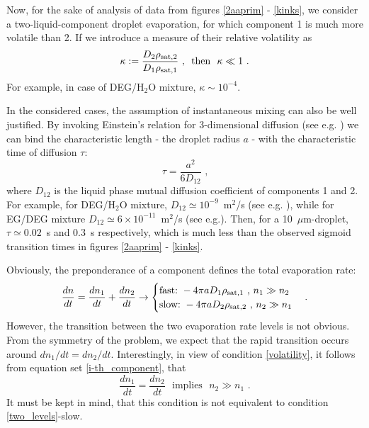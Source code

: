 \documentclass[twoside,twocolumn,9pt]{article}
\begin{document}
Now, for the sake of analysis of data from figures \ref{2aaprim} - \ref{kinks}, we consider a two-liquid-component droplet evaporation, for which component 1 is much more volatile than 2. If we introduce a measure of their relative volatility as
\begin{equation}
\kappa := \frac{D_2\rho_{{\rm sat},2}}{D_1\rho_{{\rm sat},1}} \mbox{~, ~then ~$\kappa  \ll 1$~.}
\label{volatility}
\end{equation}
For example, in case of DEG/H$_2$O mixture, $\kappa \sim 10^{-4}$. 

In the considered cases, the assumption of instantaneous mixing can also be well justified. By invoking Einstein's relation \cite{Einstein1907} for 3-dimensional diffusion (see e.g. \cite{Keffer}) we can bind the characteristic length - the droplet radius $a$ - with the characteristic time of diffusion $\tau$:
\begin{equation}
\tau = \frac{a^2}{6D_{12}} \mbox{~,} \label{Einstein_diffusion}
\end{equation}
where $D_{12}$ is the liquid phase mutual diffusion coefficient of components 1 and 2. For example, for DEG/H$_2$O mixture, $D_{12} \simeq 10^{-9}$~m$^2$/s (see e.g. \cite{Wang_glycols_diffusion}), while for EG/DEG mixture $D_{12} \simeq 6 \times 10^{-11}$~m$^2$/s (see e.g.\cite{Mitchel}). Then, for a 10~$\mu$m-droplet, $\tau \simeq 0.02$~s and  0.3~s respectively, which is much less than the observed sigmoid transition times in figures  \ref{2aaprim} - \ref{kinks}.

Obviously, the preponderance of a component defines the total evaporation rate:
\begin{equation}
\frac{dn}{dt}=\frac{dn_1}{dt}+\frac{dn_2}{dt} \rightarrow
\begin{cases}
\mbox{fast:~} -4\pi a D_1\rho_{{\rm sat},1} \mbox{~,~} n_1 \gg n_2 \\
\mbox{slow:~} -4\pi a D_2\rho_{{\rm sat},2} \mbox{~,~} n_2 \gg n_1
\end{cases} \mbox{.}
\label{two_levels}
\end{equation}
However, the transition between the two evaporation rate levels is not obvious. From the symmetry of the problem, we expect that the rapid transition occurs around $dn_1/dt=dn_2/dt$. Interestingly, in view of condition \ref{volatility}, it follows from equation set \ref{i-th_component}, that 
\begin{equation}
\frac{dn_1}{dt}=\frac{dn_2}{dt} \mbox{~~implies~~} n_2 \gg n_1 \mbox{~.}
\label{equal_rates}
\end{equation}
It must be kept in mind, that this condition is not equivalent to condition \ref{two_levels}-slow.
\end{document}

